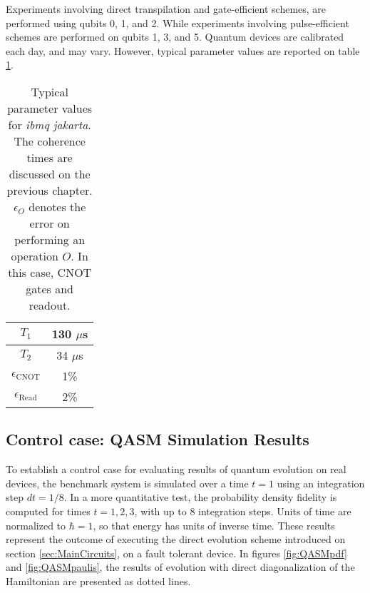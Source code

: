     Experiments involving direct transpilation and gate-efficient schemes, are performed using qubits 0, 1, and 2. While experiments involving pulse-efficient schemes are performed on qubits 1, 3, and 5. Quantum devices are calibrated each day, and may vary. However, typical parameter values are reported on table \ref{tab:jakartaParams}.

    \begin{table}[!htbp]
      \begin{center}
        \begin{tabular}{| c | c |}
          \hline 
          $T_1$ & 130 $\mu$s \\
          \hline
          $T_2$ & 34 $\mu$s \\
          \hline
          $\epsilon_{\text{CNOT}}$ & 1\% \\
          \hline
          $\epsilon_{\text{Read}}$ & 2\% \\
          \hline
        \end{tabular}
      \end{center}
      \caption{Typical parameter values for \textit{ibmq jakarta}. The coherence times are discussed on the previous chapter. $\epsilon_O$ denotes the error on performing an operation $O$. In this case, CNOT gates and readout.}
      \label{tab:jakartaParams}
    \end{table}
  
  \subsection{Control case: QASM Simulation Results}
  \label{subsec:QASMResults}

    To establish a control case for evaluating results of quantum evolution on real devices, the benchmark system is simulated over a time $t = 1$ using an integration step $dt = 1/8$. In a more quantitative test, the probability density fidelity is computed for times $t = 1, 2, 3$, with up to $8$ integration steps. Units of time are normalized to $\hbar = 1$, so that energy has units of inverse time. These results represent the outcome of executing the direct evolution scheme introduced on section \ref{sec:MainCircuits}, on a fault tolerant device. In figures \ref{fig:QASMpdf} and \ref{fig:QASMpaulis}, the results of evolution with direct diagonalization of the Hamiltonian are presented as dotted lines.

